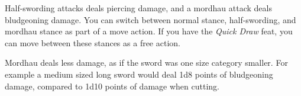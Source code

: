 \begin{note}
  Half-swording attacks deals piercing damage, and a mordhau attack deals
  bludgeoning damage. You can switch between normal stance, half-swording, and
  mordhau stance as part of a move action. If you have the \emph{Quick Draw}
  feat, you can move between these stances as a free action.

  Mordhau deals less damage, as if the sword was one size category
  smaller. For example a medium sized long sword would deal 1d8 points of
  bludgeoning damage, compared to 1d10 points of damage when cutting.
\end{note}
